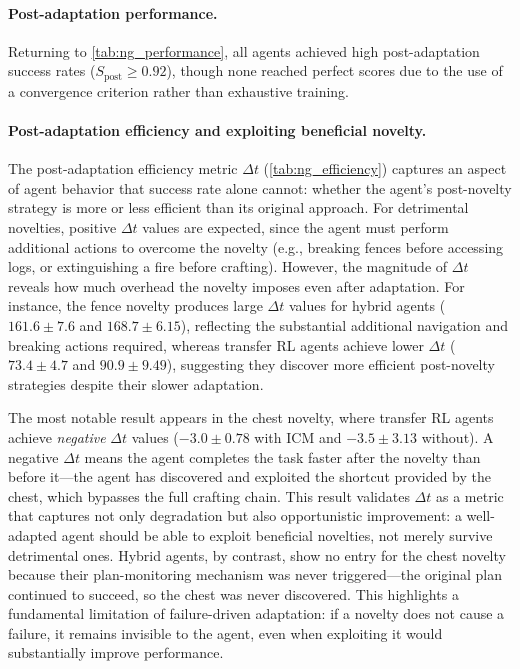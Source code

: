 \paragraph{Post-adaptation performance.} Returning to \cref{tab:ng_performance}, all agents achieved high post-adaptation success rates ($S_\text{post} \geq 0.92$), though none reached perfect scores due to the use of a convergence criterion rather than exhaustive training.

\paragraph{Post-adaptation efficiency and exploiting beneficial novelty.} The post-adaptation efficiency metric $\Delta t$ (\cref{tab:ng_efficiency}) captures an aspect of agent behavior that success rate alone cannot: whether the agent's post-novelty strategy is more or less efficient than its original approach. For detrimental novelties, positive $\Delta t$ values are expected, since the agent must perform additional actions to overcome the novelty (e.g., breaking fences before accessing logs, or extinguishing a fire before crafting). However, the magnitude of $\Delta t$ reveals how much overhead the novelty imposes even after adaptation. For instance, the fence novelty produces large $\Delta t$ values for hybrid agents ($161.6 \pm 7.6$ and $168.7 \pm 6.15$), reflecting the substantial additional navigation and breaking actions required, whereas transfer RL agents achieve lower $\Delta t$ ($73.4 \pm 4.7$ and $90.9 \pm 9.49$), suggesting they discover more efficient post-novelty strategies despite their slower adaptation.

The most notable result appears in the chest novelty, where transfer RL agents achieve \emph{negative} $\Delta t$ values ($-3.0 \pm 0.78$ with ICM and $-3.5 \pm 3.13$ without). A negative $\Delta t$ means the agent completes the task faster after the novelty than before it---the agent has discovered and exploited the shortcut provided by the chest, which bypasses the full crafting chain. This result validates $\Delta t$ as a metric that captures not only degradation but also opportunistic improvement: a well-adapted agent should be able to exploit beneficial novelties, not merely survive detrimental ones. Hybrid agents, by contrast, show no entry for the chest novelty because their plan-monitoring mechanism was never triggered---the original plan continued to succeed, so the chest was never discovered. This highlights a fundamental limitation of failure-driven adaptation: if a novelty does not cause a failure, it remains invisible to the agent, even when exploiting it would substantially improve performance.

